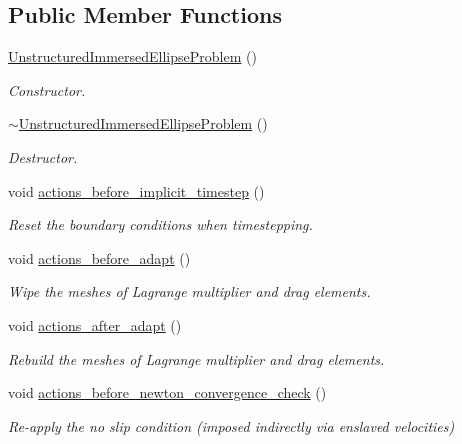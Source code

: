\subsection*{Public Member Functions}
\begin{DoxyCompactItemize}
\item 
\hyperlink{classUnstructuredImmersedEllipseProblem_a544a35f261200bb4a4e29a88faa1a69c}{Unstructured\+Immersed\+Ellipse\+Problem} ()
\begin{DoxyCompactList}\small\item\em Constructor. \end{DoxyCompactList}\item 
\hyperlink{classUnstructuredImmersedEllipseProblem_a84cdf81be59fc646eb4d5b3bc0ff4280}{$\sim$\+Unstructured\+Immersed\+Ellipse\+Problem} ()
\begin{DoxyCompactList}\small\item\em Destructor. \end{DoxyCompactList}\item 
void \hyperlink{classUnstructuredImmersedEllipseProblem_a368c412c4c9a9e9403b4e67d3582e3a5}{actions\+\_\+before\+\_\+implicit\+\_\+timestep} ()
\begin{DoxyCompactList}\small\item\em Reset the boundary conditions when timestepping. \end{DoxyCompactList}\item 
void \hyperlink{classUnstructuredImmersedEllipseProblem_aa560217a33a9a9bc150fbdf15dbf1877}{actions\+\_\+before\+\_\+adapt} ()
\begin{DoxyCompactList}\small\item\em Wipe the meshes of Lagrange multiplier and drag elements. \end{DoxyCompactList}\item 
void \hyperlink{classUnstructuredImmersedEllipseProblem_ab1558b409285aea617f4abf7d3a64b3d}{actions\+\_\+after\+\_\+adapt} ()
\begin{DoxyCompactList}\small\item\em Rebuild the meshes of Lagrange multiplier and drag elements. \end{DoxyCompactList}\item 
void \hyperlink{classUnstructuredImmersedEllipseProblem_afa51876a2af9dd7640ff1f5a434804bf}{actions\+\_\+before\+\_\+newton\+\_\+convergence\+\_\+check} ()
\begin{DoxyCompactList}\small\item\em Re-\/apply the no slip condition (imposed indirectly via enslaved velocities) \end{DoxyCompactList}\item 

\end{DoxyCompactItemize}
